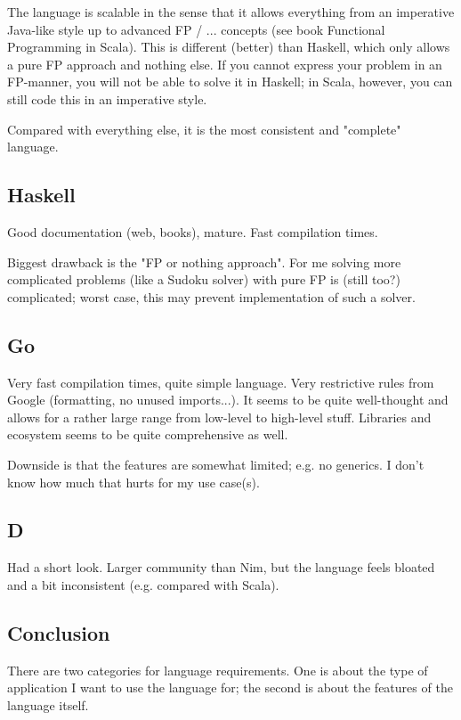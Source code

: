 The language is scalable in the sense that it allows everything from an imperative Java-like style up to advanced FP / ... concepts (see book Functional Programming in Scala). This is different (better) than Haskell, which only allows a pure FP approach and nothing else. If you cannot express your problem in an FP-manner, you will not be able to solve it in Haskell; in Scala, however, you can still code this in an imperative style.

Compared with everything else, it is the most consistent and "complete" language.

\subsection{Haskell}

Good documentation (web, books), mature. Fast compilation times.

Biggest drawback is the "FP or nothing approach". For me solving more complicated problems (like a Sudoku solver) with pure FP is (still too?) complicated; worst case, this may prevent implementation of such a solver.

\subsection{Go}

Very fast compilation times, quite simple language. Very restrictive rules from Google (formatting, no unused imports...). It seems to be quite well-thought and allows for a rather large range from low-level to high-level stuff. Libraries and ecosystem seems to be quite comprehensive as well.

Downside is that the features are somewhat limited; e.g. no generics. I don't know how much that hurts for my use case(s).


\subsection{D}

Had a short look. Larger community than Nim, but the language feels bloated and a bit inconsistent (e.g. compared with Scala).

\subsection{Conclusion}

There are two categories for language requirements. One is about the type of application I want to use the language for; the second is about the features of the language itself.

